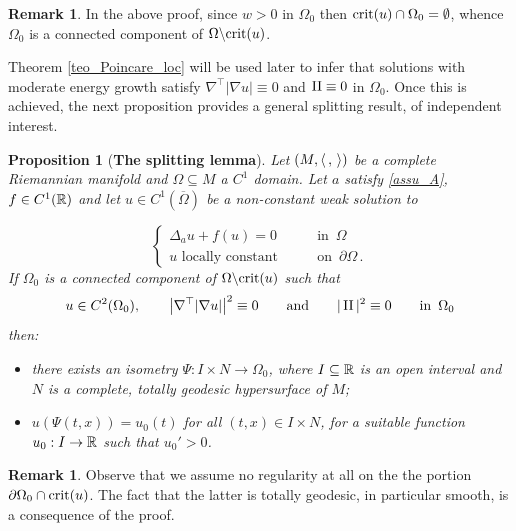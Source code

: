 \documentclass[10 pt,a4paper]{article}
\newtheorem{proposition}[definition]{Proposition}
\theoremstyle{definition}
\newtheorem{remark}[definition]{Remark}
\begin{document}
\begin{remark}
	In the above proof, since $w>0$ in $\Omega_0$ then ${\rm crit}(u)\cap\Omega_0 = \emptyset$, whence $\Omega_0$ is a connected component of $\Omega\backslash{\rm crit}(u)$.
\end{remark}

Theorem \ref{teo_Poincare_loc} will be used later to infer that solutions with moderate energy growth satisfy $\nabla^\top|\nabla u| \equiv 0$ and $\operatorname{II} \equiv 0$ in $\Omega_0$. Once this is achieved, the next proposition provides a general splitting result, of independent interest.



\begin{proposition}[\textbf{The splitting lemma}] \label{prop_splitting_alt}
	Let $(M,\langle \, , \, \rangle)$ be a complete Riemannian manifold and $\Omega\subseteq M$ a $C^1$ domain. Let $a$ satisfy \eqref{assu_A}, $f \in C^1(\mathbb R)$ and let $u\in C^1(\overline{\Omega})$ be a non-constant weak solution to
	 
	\[
		\left\{
			\begin{array}{ll}
				\Delta_a u + f(u) = 0 & \qquad \text{in } \, \Omega \\[0.2cm]
				u \text{ locally constant} & \qquad \text{on } \, \partial\Omega \, .
			\end{array}
		\right.
	\]
	If $\Omega_0$ is a connected component of $\Omega\backslash{\rm crit}(u)$ such that
	\begin{equation} \label{Ddu_trivial}
		u \in C^2(\Omega_0), \qquad \big|\nabla^\top  |\nabla u|\big|^2 \equiv 0 \qquad \text{and} \qquad |\operatorname{II}|^2 \equiv 0 \qquad \text{in } \, \Omega_0
	\end{equation}
	then:
	\begin{itemize}
		\item [i)] there exists an isometry $\Psi : I \times N \to \Omega_0$, where $I\subseteq\mathbb R$ is an open interval and $N$ is a complete, totally geodesic hypersurface of $M$;
		\item [ii)] $u(\Psi(t,x)) = u_0(t)$ for all $(t,x)\in I\times N$, for a suitable function $u_0 : I \to \mathbb R$ such that $u_0'>0$.
	\end{itemize}
\end{proposition}

\begin{remark}
	Observe that we assume no regularity at all on the the portion $\partial \Omega_0 \cap {\rm crit}(u)$. The fact that the latter is totally geodesic, in particular smooth, is a consequence of the proof.	
\end{remark}
\end{document}
